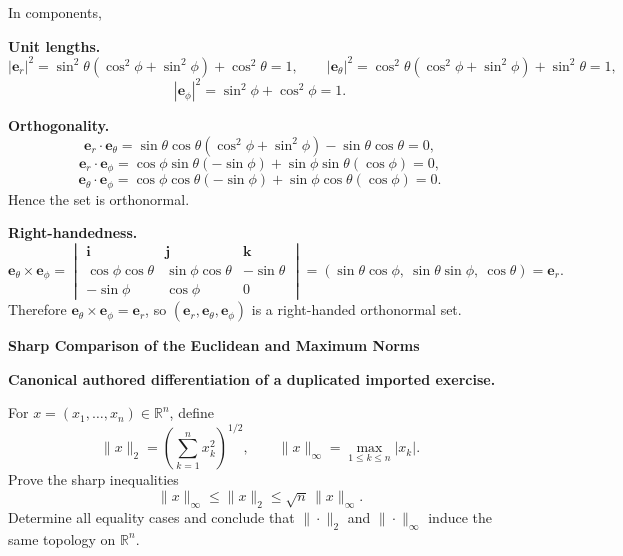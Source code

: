 \begin{solution}
In components,
\begin{center}
\end{center}

\medskip
\noindent\textbf{Unit lengths.}
\[
|\mathbf e_r|^2=\sin^2\theta(\cos^2\phi+\sin^2\phi)+\cos^2\theta=1,\qquad
|\mathbf e_\theta|^2=\cos^2\theta(\cos^2\phi+\sin^2\phi)+\sin^2\theta=1,
\]
\[
|\mathbf e_\phi|^2=\sin^2\phi+\cos^2\phi=1.
\]

\medskip
\noindent\textbf{Orthogonality.}
\[
\mathbf e_r\cdot\mathbf e_\theta
=\sin\theta\cos\theta(\cos^2\phi+\sin^2\phi)-\sin\theta\cos\theta=0,
\]
\[
\mathbf e_r\cdot\mathbf e_\phi
=\cos\phi\sin\theta(-\sin\phi)+\sin\phi\sin\theta(\cos\phi)=0,
\]
\[
\mathbf e_\theta\cdot\mathbf e_\phi
=\cos\phi\cos\theta(-\sin\phi)+\sin\phi\cos\theta(\cos\phi)=0.
\]
Hence the set is orthonormal.

\medskip
\noindent\textbf{Right-handedness.}
\[
\mathbf e_\theta\times \mathbf e_\phi
=
\begin{vmatrix}
	\mathbf i&\mathbf j&\mathbf k\\
	\cos\phi\cos\theta&\sin\phi\cos\theta&-\sin\theta\\
	-\sin\phi&\cos\phi&0
\end{vmatrix}
=(\sin\theta\cos\phi,\ \sin\theta\sin\phi,\ \cos\theta)=\mathbf e_r.
\]
Therefore \(\mathbf e_\theta\times\mathbf e_\phi=\mathbf e_r\), so
\((\mathbf e_r,\mathbf e_\theta,\mathbf e_\phi)\) is a right-handed orthonormal set.
\end{solution}

\begin{problem}[CP-I-0068]
\label{prob:cp-i-0068}
\textbf{Sharp Comparison of the Euclidean and Maximum Norms}

\textbf{Canonical authored differentiation of a duplicated imported exercise.}

\hspace*{1.5em}For \(x=(x_1,\dots,x_n)\in\mathbb{R}^n\), define
\[
\|x\|_2=\left(\sum_{k=1}^{n}x_k^2\right)^{1/2},
\qquad
\|x\|_\infty=\max_{1\le k\le n}|x_k|.
\]
Prove the sharp inequalities
\[
\|x\|_\infty\le \|x\|_2\le \sqrt n\,\|x\|_\infty.
\]
Determine all equality cases and conclude that \(\|\cdot\|_2\) and \(\|\cdot\|_\infty\) induce the same
topology on \(\mathbb{R}^n\).
\end{problem}

